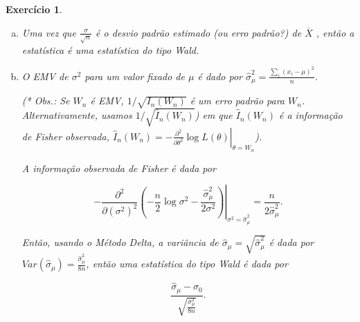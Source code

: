 \documentclass[letter,11pt]{article}
\newtheorem{exer}{Exercício}
\begin{document}

\begin{exer} \rm 

\begin{enumerate}[a)]

\item %

Uma vez que $\frac{\sigma}{\sqrt n}$ é o desvio padrão estimado (ou erro padrão?) de $\overline X$ , então a estatística é uma estatística do tipo Wald.

\item %

O EMV de $\sigma^2$ para um valor fixado de $\mu$ é dado por $\hat \sigma^2_\mu = \frac{\sum_i (x_i - \mu)^2}{n}$. 

(* Obs.: Se $W_n$ é EMV, $1 / \sqrt{I_n(W_n)}$ é um erro padrão para $W_n$. Alternativamente, usamos $1 / \sqrt{\hat{I}_n(W_n)}$) em que $\hat{I}_n(W_n)$ é a informação de Fisher observada, $\left. \hat{I}_n(W_n) = - \frac{\partial^2}{\partial \theta^2} \log L(\theta) \right|_{\theta = W_n}$).

A informação observada de Fisher é dada por 

$$\left. - \frac{\partial^2}{\partial (\sigma^2)^2} \left(- \frac{n}{2} \log \sigma^2 - \frac{\hat \sigma^2_\mu}{2 \sigma^2} \right) \right|_{\sigma^2 = \hat \sigma^2_\mu} = \frac{n}{2 \hat \sigma^2_\mu}.$$

Então, usando o Método Delta, a variância de $\hat \sigma_\mu = \sqrt{\hat \sigma^2_\mu}$ é dada por $Var(\hat \sigma_\mu) = \frac{\hat \sigma^2_\mu}{8n}$, então uma estatística do tipo Wald é dada por

$$\frac{\hat \sigma_\mu - \sigma_0}{\sqrt{\frac{\sigma^2_\mu}{8n}}}.$$

\end{enumerate}
\end{exer}
\end{document}
